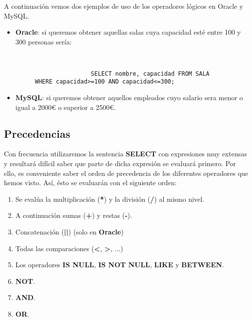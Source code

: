 A continuación vemos dos ejemplos de uso de los operadores lógicos en Oracle y MySQL.

\begin{itemize}
    \item \textbf{Oracle}: si queremos obtener aquellas salas cuya capacidad esté entre 100 y 300 personas sería:

    \begin{figure}[h]
        \begin{tcolorbox}[sharp corners, colback=yellow!30, colframe=white!20]
            \scriptsize
            \begin{verbatim}


                SELECT nombre, capacidad FROM SALA WHERE capacidad>=100 AND capacidad<=300;
            \end{verbatim}
        \end{tcolorbox}
    \end{figure}

    \item \textbf{MySQL}: si queremos obtener aquellos empleados cuyo salario sera menor o igual a 2000€ o superior a 2500€.
\end{itemize}

\subsection{Precedencias}
Con frecuencia utilizaremos la sentencia \textbf{SELECT} con expresiones muy extensas y resultará difícil saber que parte de dicha expresión se evaluará primero. Por ello, es conveniente saber el orden de precedencia de los diferentes operadores que hemos visto. Así, ésto se evaluarán con el siguiente orden:

\begin{enumerate}
    \item Se evalúa la multiplicación (\textbf{*}) y la división (\textbf{/}) al mismo nivel.
    \item A continuación sumas (\textbf{+}) y restas (\textbf{-}).
    \item Concatenación (\textbf{||}) (solo en \textbf{Oracle})
    \item Todas las comparaciones (\textbf{<}, \textbf{>}, ...)
    \item Los operadores \textbf{IS NULL}, \textbf{IS NOT NULL}, \textbf{LIKE} y \textbf{BETWEEN}.
    \item \textbf{NOT}.
    \item \textbf{AND}.
    \item \textbf{OR}.
\end{enumerate}

